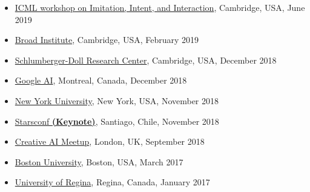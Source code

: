 \documentclass[paper=letter,fontsize=11pt]{scrartcl} %
\newcommand{\TalkEntry}[4]{
        \noindent \href{#4}{#1}, #2, #3 }
\begin{document}
\begin{itemize}
\item\TalkEntry{ICML workshop on Imitation, Intent, and Interaction}{Cambridge, USA}{June 2019}{https://slideslive.com/38917621/social-learning-from-agents-and-humans} 
\item\TalkEntry{Broad Institute}{Cambridge, USA}{February 2019}{https://www.youtube.com/watch?v=Vx5Daxa0Yts} 
\item\TalkEntry{Schlumberger-Doll Research Center}{Cambridge, USA}{December 2018}{} 
\item\TalkEntry{Google AI}{Montreal, Canada}{December 2018}{} 
\item\TalkEntry{New York University}{New York, USA}{November 2018}{} 
\item\TalkEntry{Starsconf \textbf{(Keynote)}}{Santiago, Chile}{November 2018}{https://www.youtube.com/watch?v=QI5Gvn8FDG0} 

\item\TalkEntry{Creative AI Meetup}{London, UK}{September 2018}{https://interests.me/org/communitytechevents/story/94296} %

\item\TalkEntry{%
Boston University}{Boston, USA}{March 2017}{} %

\item\TalkEntry{%
University of Regina}{Regina, Canada}{January 2017}{} %
\end{itemize}
\end{document}
